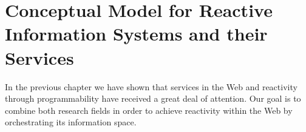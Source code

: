 
\chapter{Conceptual Model for Reactive Information Systems and their Services}

%


In the previous chapter we have shown that services in the Web and reactivity through programmability have received a great deal of attention.
Our goal is to combine both research fields in order to achieve reactivity within the Web by orchestrating its information space. 

